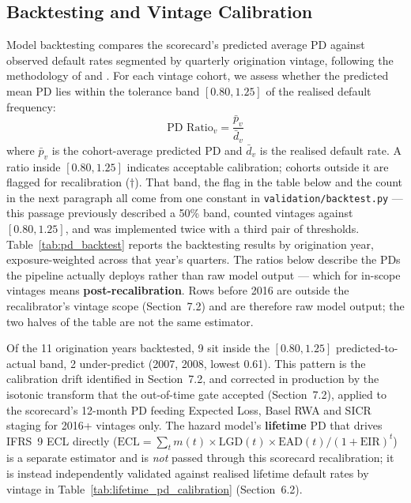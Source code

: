 \documentclass[11pt,a4paper]{article}
\begin{document}
\subsection{Backtesting and Vintage Calibration}

Model backtesting compares the scorecard's predicted average PD against observed default rates segmented by quarterly origination vintage, following the methodology of \parencite{eba2017} and \parencite{bcbs2005}. For each vintage cohort, we assess whether the predicted mean PD lies within the tolerance band $[0.80, 1.25]$ of the realised default frequency:
\begin{equation}
\text{PD Ratio}_{v} = \frac{\bar{p}_v}{\bar{d}_v}
\end{equation}
where $\bar{p}_v$ is the cohort-average predicted PD and $\bar{d}_v$ is the realised default rate. A ratio inside $[0.80, 1.25]$ indicates acceptable calibration; cohorts outside it are flagged for recalibration ($\dagger$). That band, the flag in the table below and the count in the next paragraph all come from one constant in \texttt{validation/backtest.py} --- this passage previously described a 50\% band, counted vintages against $[0.80, 1.25]$, and was implemented twice with a third pair of thresholds. Table~\ref{tab:pd_backtest} reports the backtesting results by origination year, exposure-weighted across that year's quarters. The ratios below describe the PDs the pipeline actually deploys rather than raw model output --- which for in-scope vintages means \textbf{post-recalibration}. Rows before 2016 are outside the recalibrator's vintage scope (Section~7.2) and are therefore raw model output; the two halves of the table are not the same estimator.

Of the 11 origination years backtested, 9 sit inside the $[0.80, 1.25]$ predicted-to-actual band, 2 under-predict (2007, 2008, lowest 0.61). This pattern is the calibration drift identified in Section~7.2, and corrected in production by the isotonic transform that the out-of-time gate accepted (Section~7.2), applied to the scorecard's 12-month PD feeding Expected Loss, Basel RWA and SICR staging for 2016+ vintages only. The hazard model's \textbf{lifetime} PD that drives IFRS~9 ECL directly ($\text{ECL} = \sum_t m(t)\times\text{LGD}(t)\times\text{EAD}(t)/(1+\text{EIR})^t$) is a separate estimator and is \emph{not} passed through this scorecard recalibration; it is instead independently validated against realised lifetime default rates by vintage in Table~\ref{tab:lifetime_pd_calibration} (Section~6.2).
\end{document}
